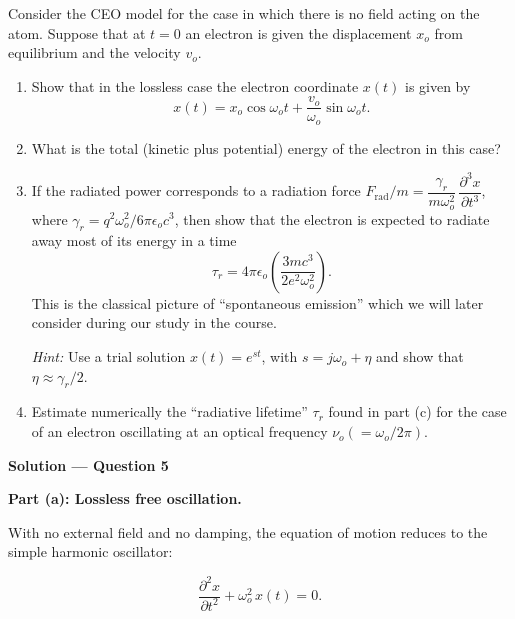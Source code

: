 \begin{question}[Question 5]Consider the CEO model for the case in which there is no field acting on
the atom. Suppose that at $t=0$ an electron is given the displacement $x_{o}$ from equilibrium
and the velocity $v_{o}$.

\begin{enumerate}[label=(\alph*)]
  \item Show that in the lossless case the electron coordinate $x(t)$ is given by
        \begin{equation*}
          x(t)=x_{o}\cos\omega_{o}t+\frac{v_{o}}{\omega_{o}}\sin\omega_{o}t.
        \end{equation*}
  \item What is the total (kinetic plus potential) energy of the electron in this case?

  \item If the radiated power corresponds to a radiation force
        $F_{\mathrm{rad}}/m=\dfrac{\gamma_{r}}{m\omega_{o}^{2}}\,\dfrac{\partial^{3}x}{\partial t^{3}}$,
        where $\gamma_{r}=q^{2}\omega_{o}^{2}/6\pi\epsilon_{o}c^{3}$, then show that the
        electron is expected to radiate away most of its energy in a time
        \begin{equation*}
          \tau_{r}=4\pi\epsilon_{o}\!\left(\frac{3mc^{3}}{2e^{2}\omega_{o}^{2}}\right).
        \end{equation*}
        This is the classical picture of ``spontaneous emission'' which we will later consider
        during our study in the course.

        \emph{Hint:} Use a trial solution $x(t)=e^{st}$, with $s=j\omega_{o}+\eta$ and show
        that $\eta\approx\gamma_{r}/2$.

  \item Estimate numerically the ``radiative lifetime'' $\tau_{r}$ found in part (c) for the
        case of an electron oscillating at an optical frequency $\nu_{o}(=\omega_{o}/2\pi)$.
\end{enumerate}
\end{question}

\textbf{\large Solution --- Question 5}

\textbf{Part (a): Lossless free oscillation.}

With no external field and no damping, the equation of motion reduces to the simple harmonic oscillator:

\begin{equation*}
  \frac{\partial^2 x}{\partial t^2} + \omega_o^2\,x(t) = 0.
\end{equation*}

